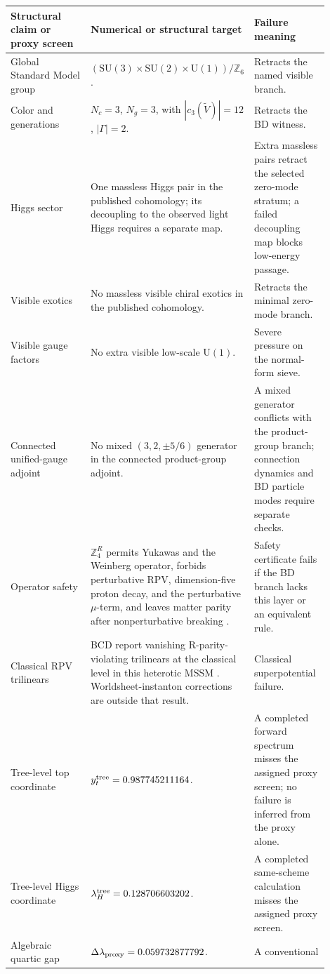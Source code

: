 \documentclass[11pt]{article}
\theoremstyle{remark}
\theoremstyle{plain}
\newcommand{\SU}{\mathrm{SU}}
\newcommand{\U}{\mathrm{U}}
\newcommand{\Z}{\mathbb Z}
\newcommand{\ZfourR}{\mathbb Z_4^R}
\begin{document}
\begin{longtable}{L{0.29\linewidth}L{0.37\linewidth}L{0.24\linewidth}}
\toprule
\textbf{Structural claim or proxy screen} & \textbf{Numerical or structural target} & \textbf{Failure meaning} \\
\midrule
Global Standard Model group &
\((\SU(3)\times\SU(2)\times\U(1))/\Z_6\). & Retracts the named visible branch. \\
Color and generations & \(N_c=3\), \(N_g=3\), with
\(|c_3(\widetilde V)|=12\), \(|\Gamma|=2\). & Retracts the BD witness. \\
Higgs sector & One massless Higgs pair in the published cohomology; its decoupling to the
observed light Higgs requires a separate map. & Extra massless pairs retract the selected
zero-mode stratum; a failed decoupling map blocks low-energy passage. \\
Visible exotics & No massless visible chiral exotics in the published cohomology. & Retracts the
minimal zero-mode branch. \\
Visible gauge factors & No extra visible low-scale \(\U(1)\). & Severe pressure on the
normal-form sieve. \\
Connected unified-gauge adjoint & No mixed \((3,2,\pm5/6)\) generator in the connected
product-group adjoint. & A mixed generator conflicts with the product-group
branch; connection dynamics and BD particle modes require separate checks. \\
Operator safety & \(\ZfourR\) permits Yukawas and the Weinberg operator, forbids perturbative
RPV, dimension-five proton decay, and the perturbative \(\mu\)-term, and leaves matter parity
after nonperturbative breaking \cite{LeeRabyRatzRossSchierenSchmidtHobergVaudrevange2010}. &
Safety certificate fails if the BD branch lacks this layer or an equivalent rule. \\
Classical RPV trilinears & BCD report vanishing R-parity-violating trilinears at the classical
level in this heterotic MSSM \cite{BouchardCveticDonagi2006}. Worldsheet-instanton corrections
are outside that result. & Classical superpotential failure. \\
Tree-level top coordinate & \(y_t^{\rm tree}=0.987745211164\). & A completed forward spectrum
misses the assigned proxy screen; no failure is inferred from the proxy alone. \\
Tree-level Higgs coordinate & \(\lambda_H^{\rm tree}=0.128706603202\). & A completed
same-scheme calculation misses the assigned proxy screen. \\
Algebraic quartic gap & \(\Delta\lambda_{\rm proxy}=0.059732877792\). & A conventional

\end{longtable}
\end{document}
